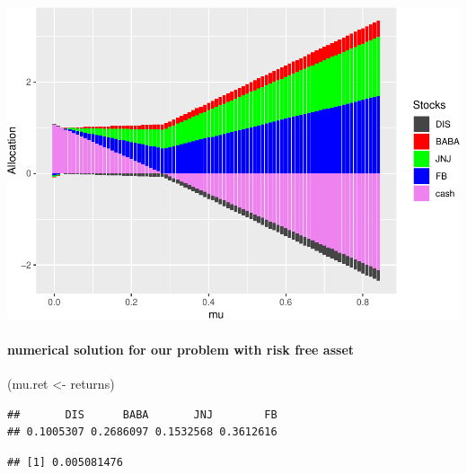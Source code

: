 \documentclass[]{article}
\newenvironment{Shaded}{\begin{snugshade}}{\end{snugshade}}
\newcommand{\KeywordTok}[1]{\textcolor[rgb]{0.13,0.29,0.53}{\textbf{#1}}}
\newcommand{\DataTypeTok}[1]{\textcolor[rgb]{0.13,0.29,0.53}{#1}}
\newcommand{\FloatTok}[1]{\textcolor[rgb]{0.00,0.00,0.81}{#1}}
\newcommand{\StringTok}[1]{\textcolor[rgb]{0.31,0.60,0.02}{#1}}
\newcommand{\OperatorTok}[1]{\textcolor[rgb]{0.81,0.36,0.00}{\textbf{#1}}}
\newcommand{\NormalTok}[1]{#1}
\let\oldparagraph\paragraph
\renewcommand{\paragraph}[1]{\oldparagraph{#1}\mbox{}}
\begin{document}
\includegraphics{Markowitz_Research_Me_files/figure-latex/unnamed-chunk-23-2.pdf}

\paragraph{numerical solution for our problem with risk free
asset}\label{numerical-solution-for-our-problem-with-risk-free-asset}

\begin{Shaded}
\begin{Highlighting}[]
\NormalTok{(mu.ret <-}\StringTok{ }\NormalTok{returns)}
\end{Highlighting}
\end{Shaded}

\begin{verbatim}
##       DIS      BABA       JNJ        FB 
## 0.1005307 0.2686097 0.1532568 0.3612616
\end{verbatim}

\begin{Shaded}
\end{Shaded}

\begin{verbatim}
## [1] 0.005081476
\end{verbatim}

\begin{Shaded}
\end{Shaded}
\end{document}
